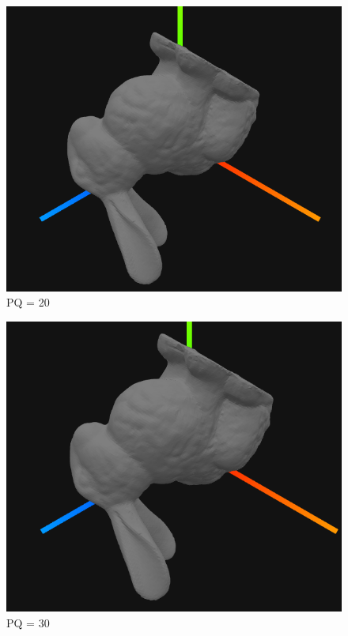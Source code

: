 \documentclass{article}
\begin{document}
\begin{figure}[h!]
\centerline{\includegraphics[scale=0.8]{./rendus/pq20.png}}
\caption{PQ = 20}
\end{figure}

\begin{figure}[h!]
\centerline{\includegraphics[scale=0.8]{./rendus/pq30.png}}
\caption{PQ = 30}
\end{figure}
\end{document}
